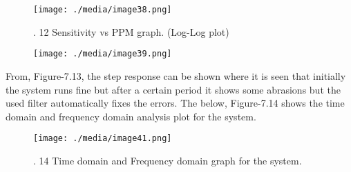 \begin{enumerate}
\vspace{\baselineskip}



\begin{figure}[H]
	\begin{Center}
		\texttt{[image: ./media/image38.png]}
		\caption{. 12 Sensitivity vs PPM graph. (Log-Log plot)}
		\label{fig:_12_Sensitivity_vs_PPM_graph_LogLog_plot}
	\end{Center}
\end{figure}



\par

\par


\vspace{\baselineskip}



\begin{figure}[H]
	\begin{Center}
		\texttt{[image: ./media/image39.png]}
	\end{Center}
\end{figure}



\par

\par

\begin{justify}
From, Figure-7.13, the step response can be shown where it is seen that initially the system runs fine but after a certain period it shows some abrasions but the used filter automatically fixes the errors. The below, Figure-7.14 shows the time domain and frequency domain analysis plot for the system.
\end{justify}\par




\begin{figure}[H]
	\begin{Center}
		\texttt{[image: ./media/image41.png]}
		\caption{. 14 Time domain and Frequency domain graph for the system.}
		\label{fig:_14_Time_domain_and_Frequency_domain_graph_for_the_system}
	\end{Center}
\end{figure}



\end{enumerate}
